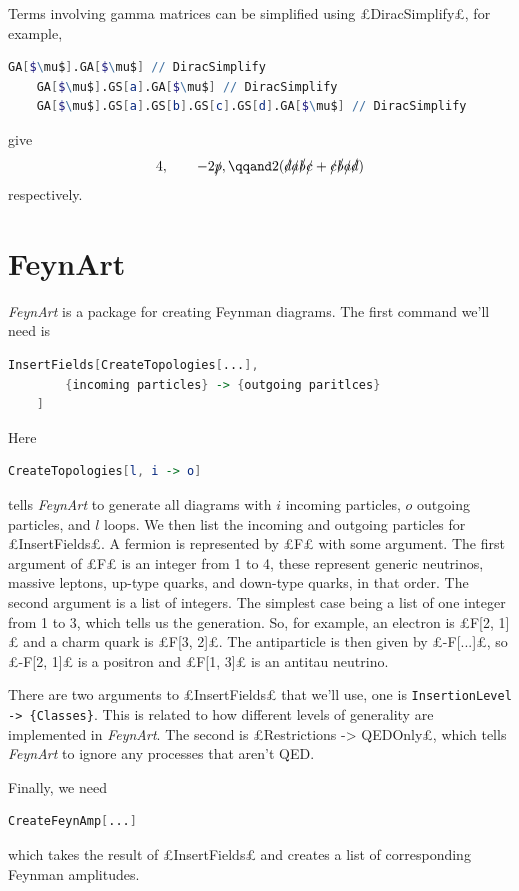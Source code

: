 Terms involving gamma matrices can be simplified using £DiracSimplify£, for example,
\begin{lstlisting}[language=mathematica, gobble=4, mathescape]
    GA[$\mu$].GA[$\mu$] // DiracSimplify
    GA[$\mu$].GS[a].GA[$\mu$] // DiracSimplify
    GA[$\mu$].GS[a].GS[b].GS[c].GS[d].GA[$\mu$] // DiracSimplify
\end{lstlisting}
give
\begin{equation}
    4, \qquad -2\slashed{p}, \qqand 2(\slashed{d}\slashed{a}\slashed{b}\slashed{c} + \slashed{c}\slashed{b}\slashed{a}\slashed{d})
\end{equation}
respectively.

\section{FeynArt}
\textit{FeynArt} is a package for creating Feynman diagrams.
The first command we'll need is
\begin{lstlisting}[language=mathematica, gobble=4]
    InsertFields[CreateTopologies[...],
        {incoming particles} -> {outgoing paritlces}
    ]
\end{lstlisting}
Here
\begin{lstlisting}[language=mathematica, gobble=4]
    CreateTopologies[l, i -> o]
\end{lstlisting}
tells \textit{FeynArt} to generate all diagrams with \(i\) incoming particles, \(o\) outgoing particles, and \(l\) loops.
We then list the incoming and outgoing particles for £InsertFields£.
A fermion is represented by £F£ with some argument.
The first argument of £F£ is an integer from 1 to 4, these represent generic neutrinos, massive leptons, up-type quarks, and down-type quarks, in that order.
The second argument is a list of integers.
The simplest case being a list of one integer from 1 to 3, which tells us the generation.
So, for example, an electron is £F[2, {1}]£ and a charm quark is £F[3, {2}]£.
The antiparticle is then given by £-F[...]£, so £-F[2, {1}]£ is a positron and £F[1, {3}]£ is an antitau neutrino.

There are two arguments to £InsertFields£ that we'll use, one is \lstinline[style=mathematica, breaklines]|InsertionLevel -> {Classes}|.
This is related to how different levels of generality are implemented in \textit{FeynArt}.
The second is £Restrictions -> QEDOnly£, which tells \textit{FeynArt} to ignore any processes that aren't QED.

Finally, we need
\begin{lstlisting}[language=mathematica, gobble=4]
    CreateFeynAmp[...]
\end{lstlisting}
which takes the result of £InsertFields£ and creates a list of corresponding Feynman amplitudes.

